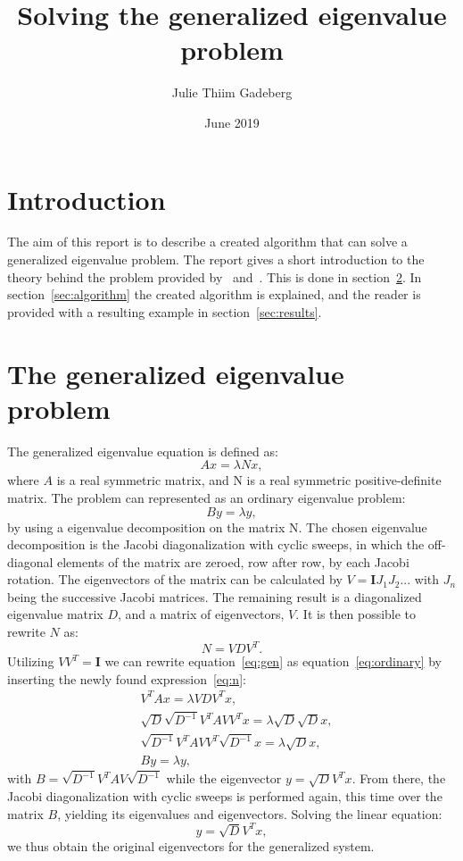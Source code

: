 \documentclass[12pt]{article}
\title{Solving the generalized eigenvalue problem}
\author{Julie Thiim Gadeberg}
\date{June 2019}
\begin{document}
\maketitle

\section{Introduction}

The aim of this report is to describe a created algorithm that can solve a generalized eigenvalue problem. The report gives a short introduction to the theory behind the problem provided by~\cite{jacobi} and~\cite{linalg}. This is done in section~\ref{sec:theory}. In section~\ref{sec:algorithm} the created algorithm is explained, and the reader is provided with a resulting example in section~\ref{sec:results}.


\section{The generalized eigenvalue problem}\label{sec:theory}

The generalized eigenvalue equation is defined as:
\begin{equation}
    Ax = \lambda N x,
    \label{eq:gen}
\end{equation}
where $A$ is a real symmetric matrix, and N is a real symmetric positive-definite matrix. The problem can represented as an ordinary eigenvalue problem:
\begin{equation}
    By = \lambda y,
    \label{eq:ordinary}
\end{equation}
by using a eigenvalue decomposition on the matrix N. The chosen eigenvalue decomposition is the Jacobi diagonalization with cyclic sweeps, in which the off-diagonal elements of the matrix are zeroed, row after row, by each Jacobi rotation. The eigenvectors of the matrix can be calculated by $V = \mathbf{I}J_1J_2...$ with $J_n$ being the successive Jacobi matrices. The remaining result is a diagonalized eigenvalue matrix $D$, and a matrix of eigenvectors, $V$. It is then possible to rewrite $N$ as:
\begin{equation}
    N = VDV^T.
    \label{eq:n}
\end{equation}
Utilizing $VV^T =\mathbf{I}$ we can rewrite equation~\ref{eq:gen} as equation~\ref{eq:ordinary} by inserting the newly found expression~\ref{eq:n}:
\begin{align}
    &V^TAx = \lambda VDV^T x,\\
    &\sqrt{D}\sqrt{D^{-1}}V^TA VV^Tx = \lambda \sqrt{D}\sqrt{D}x,\\
    &\sqrt{D^{-1}}V^TAVV^T\sqrt{D^{-1}}x = \lambda \sqrt{D}x,\\\label{eq:B}
    &By = \lambda y,
\end{align}
with $B = \sqrt{D^{-1}}V^TAV\sqrt{D^{-1}}$ while the eigenvector $y = \sqrt{D}V^Tx$. From there, the Jacobi diagonalization with cyclic sweeps is performed again, this time over the matrix $B$, yielding its eigenvalues and eigenvectors. Solving the linear equation:
\begin{equation}
    y = \sqrt{D}V^T x,
\end{equation}
we thus obtain the original eigenvectors for the generalized system.
\end{document}
